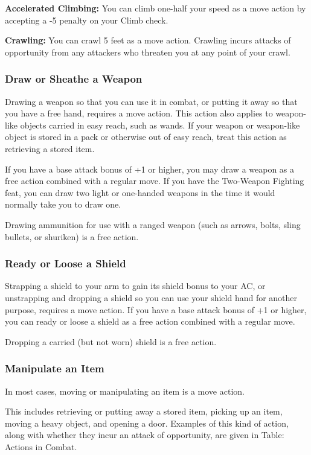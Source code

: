 \textbf{Accelerated Climbing:} You can climb one-half your speed as a move action by accepting a -5 penalty on your Climb check.

\textbf{Crawling:} You can crawl 5 feet as a move action. Crawling incurs attacks of opportunity from any attackers who threaten you at any point of your crawl.

\subsubsection{Draw or Sheathe a Weapon}

Drawing a weapon so that you can use it in combat, or putting it away so that you have a free hand, requires a move action. This action also applies to weapon-like objects carried in easy reach, such as wands. If your weapon or weapon-like object is stored in a pack or otherwise out of easy reach, treat this action as retrieving a stored item.

If you have a base attack bonus of +1 or higher, you may draw a weapon as a free action combined with a regular move. If you have the Two-Weapon Fighting feat, you can draw two light or one-handed weapons in the time it would normally take you to draw one.

Drawing ammunition for use with a ranged weapon (such as arrows, bolts, sling bullets, or shuriken) is a free action.

\subsubsection{Ready or Loose a Shield}

Strapping a shield to your arm to gain its shield bonus to your AC, or unstrapping and dropping a shield so you can use your shield hand for another purpose, requires a move action. If you have a base attack bonus of +1 or higher, you can ready or loose a shield as a free action combined with a regular move.

Dropping a carried (but not worn) shield is a free action.

\subsubsection{Manipulate an Item}

In most cases, moving or manipulating an item is a move action.

This includes retrieving or putting away a stored item, picking up an item, moving a heavy object, and opening a door. Examples of this kind of action, along with whether they incur an attack of opportunity, are given in Table: Actions in Combat.

